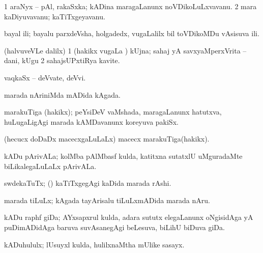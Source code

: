 {{{{{{{\bentry
{} 
\gl{\nA}
\expl{}
\bmng
\bnum
\num{1} araNyx -- pAl, rakaSxka; kADina maragaLanunx noVDikoLuLxvavanu. 
\num{2} mara kaDiyuvavanu; kaTiTxgeyavanu. 
\enum
\emng
\eentry

\bentry
{} 
\gl{\nA}
\bmng
bayal ili; bayalu parxdeVsha, holgadedx, \mo vugaLalilx bil toVDikoMDu vAsisuva ili. 
\emng
\eentry

\bentry
{} 
\gl{\nA}
\expl{}
\bmng
(halvuveVLe \bava dalilx) 
\bnum
\num{1} (hakikx \mo vugaLa \vi) kUjna; sahaj yA savxyaMperxVrita -- dani, kUgu 
\num{2} sahajsUPxtiRya kavite. 
\enum
\emng
\eentry

\bentry
{} 
\gl{\nA}
\expl{}
\bmng
vaqkaSx -- deVvate, deVvi. 
\emng
\eentry

\bentry
{} 
\gl{\nA}
\expl{}
\bmng
marada nAriniMda mADida kAgada. 
\emng
\eentry

\bentry
{} 
\gl{\nA}
\expl{}
\bmng
marakuTiga (hakikx); peYsiDeV vaMshada, maragaLanunx hatutxva, huLugaLigAgi marada kAMDavanunx koreyuva pakiSx. 
\emng
\eentry

\bentry
{} 
\gl{\nA}
\expl{}
\bmng
(hecucx doDaDx macecxgaLuLaLx) macecx marakuTiga(hakikx). 
\emng
\eentry

\bentry
{} 
\gl{\nA}
\expl{}
\bmng
kADu pArivALa; kolMba pAlMbasf kulda, katitxna sutatxlU uMguradaMte biLikalegaLuLaLx pArivALa. 
\emng
\eentry

\bentry
{} 
\gl{\nA}
\expl{}
\bmng
swdekaTuTx; (\kanmu) kaTiTxgegAgi kaDida marada rAshi. 
\emng

\noindent
\gl{\pagu}
\expl{}
\bmng
{} 
\emng
\eentry
 
\bentry
{} 
\gl{\nA}
\expl{}
\bmng
marada tiLuLx; kAgada tayArisalu tiLuLxmADida marada nAru. 
\emng
\eentry

\bentry
{} 
\gl{\nA}
\expl{}
\bmng
kADu raphf giDa; AYxsapxrul kulda, adara sututx elegaLanunx oNgisidAga yA puDimADidAga baruva suvAsanegAgi beLesuva, biLihU biDuva giDa. 
\emng
\eentry

\bentry
{} 
\gl{\nA}
\expl{}
\bmng
kADuhululx; lUsuyxl kulda, hulilxnaMtha mUlike sasayx. 
\emng
\eentry

}}}}}}}
